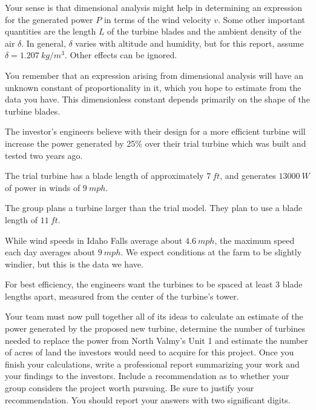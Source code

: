 \documentclass[11pt]{article}
\begin{document}
    \begin{compactitem}

        \item Your sense is that dimensional analysis might help in
        determining an expression for the generated power $P$ in terms of the
        wind velocity $v$. Some other important quantities are the length $L$ of the
        turbine blades and the ambient density of the air $\delta$. In
        general, $\delta$ varies with altitude and humidity, but for this
        report, assume $\delta = \SI{1.207}{kg/m^3}$. Other
        effects can be ignored.
        \item You remember that an expression arising from dimensional
        analysis will have an unknown constant of proportionality in it, which
        you hope to estimate from the data you have. This dimensionless
        constant depends primarily on the shape of the turbine blades.
        \item The investor's engineers believe with their design for a more
        efficient turbine will increase the power generated by 
        25\% over their trial turbine which was built and
        tested two years ago.
        \item The trial turbine has a blade length of approximately
        $\SI{7}{ft}$, and generates
        $\SI{13000}{W}$ of power in winds of
        $\SI{9}{mph}$.
        \item The group plans a turbine larger than the trial model. They plan
        to use a blade length of $\SI{11}{ft}$.
        \item While wind speeds in Idaho Falls average about
        $\SI{4.6}{mph}$, the maximum speed each day averages
        about $\SI{9}{mph}$. We expect conditions at the farm
        to be slightly windier, but this is the data we have.
        \item For best efficiency, the engineers want the turbines to be
        spaced at least $3$ blade lengths apart, measured from the center of
        the turbine's tower.

    \end{compactitem}


    Your team must now pull together all of its ideas to calculate an estimate
    of the power generated by the proposed new turbine, determine the number
    of turbines needed to replace the power from North Valmy's Unit
    1 and estimate the number of acres of land the investors would
    need to acquire for this project. Once you finish your calculations, write
    a professional report summarizing your work and your findings to the
    investors. Include a recommendation as to whether your group considers the
    project worth pursuing. Be sure to justify your recommendation. You should
    report your answers with two significant digits.
\end{document}
